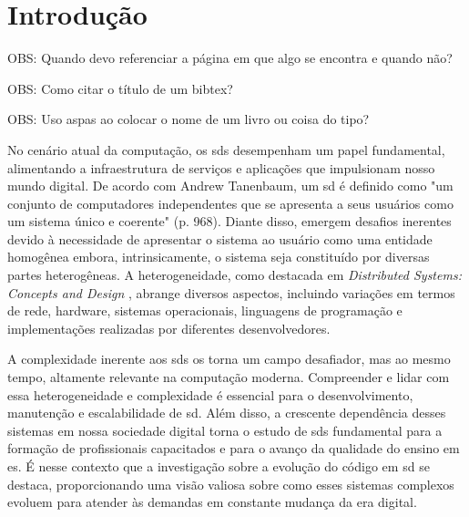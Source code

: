 
\chapter{Introdução}\label{cap:introducao}
OBS: Quando devo referenciar a página em que algo se encontra e quando não?

OBS: Como citar o título de um bibtex?

OBS: Uso aspas ao colocar o nome de um livro ou coisa do tipo?

No cenário atual da computação, os \gls{sds} desempenham um papel fundamental, alimentando a infraestrutura de serviços e aplicações que impulsionam nosso mundo digital. De acordo com Andrew Tanenbaum, um \gls{sd} é definido como "um conjunto de computadores independentes que se apresenta a seus usuários como um sistema único e coerente" \cite{TanenbaumDistributedSystemsThirdEdition}(p. 968). Diante disso, emergem desafios inerentes devido à necessidade de apresentar o sistema ao usuário como uma entidade homogênea embora, intrinsicamente, o sistema seja constituído por diversas partes heterogêneas. A heterogeneidade, como destacada em \textit{Distributed Systems: Concepts and Design} \cite{DistributedSystemsCoulouris}, abrange diversos aspectos, incluindo variações em termos de rede, hardware, sistemas operacionais, linguagens de programação e implementações realizadas por diferentes desenvolvedores.

A complexidade inerente aos \gls{sds} os torna um campo desafiador, mas ao mesmo tempo, altamente relevante na computação moderna. Compreender e lidar com essa heterogeneidade e complexidade é essencial para o desenvolvimento, manutenção e escalabilidade de \gls{sd}. Além disso, a crescente dependência desses sistemas em nossa sociedade digital torna o estudo de \gls{sds} fundamental para a formação de profissionais capacitados e para o avanço da qualidade do ensino em \gls{es}. É nesse contexto que a investigação sobre a evolução do código em \gls{sd} se destaca, proporcionando uma visão valiosa sobre como esses sistemas complexos evoluem para atender às demandas em constante mudança da era digital.

